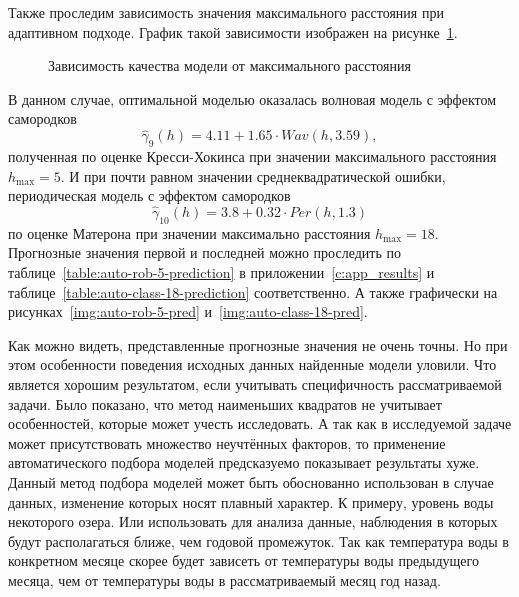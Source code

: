 Также проследим зависимость значения максимального расстояния при адаптивном подходе. График такой зависимости изображен на рисунке~\ref{img:auto-mse-cutoff}.
\begin{figure}[ht]
\caption{Зависимость качества модели от максимального расстояния}
\label{img:auto-mse-cutoff}
\end{figure}
В данном случае, оптимальной моделью оказалась волновая модель с эффектом самородков
\begin{equation*}
 	\widehat{\gamma}_9(h) = 4.11 + 1.65 \cdot Wav(h, 3.59),
\end{equation*}
полученная по оценке Кресси-Хокинса при значении максимального расстояния $ h_{\text{max}} = 5 $. И при почти равном значении среднеквадратической ошибки, периодическая модель с эффектом самородков
\begin{equation*}
 	\widehat{\gamma}_{10}(h) = 3.8 + 0.32 \cdot Per(h, 1.3)
\end{equation*}
по оценке Матерона при значении максимально расстояния $ h_{\text{max}} = 18 $. Прогнозные значения первой и последней можно проследить по таблице~\ref{table:auto-rob-5-prediction} в приложении~\ref{c:app_results} и таблице~\ref{table:auto-class-18-prediction} соответственно. А также графически на рисунках~\ref{img:auto-rob-5-pred} и~\ref{img:auto-class-18-pred}.


Как можно видеть, представленные прогнозные значения не очень точны. Но при этом особенности поведения исходных данных найденные модели уловили. Что является хорошим результатом, если учитывать специфичность рассматриваемой задачи. Было показано, что метод наименьших квадратов не учитывает особенностей, которые может учесть исследовать. А так как в исследуемой задаче может присутствовать множество неучтённых факторов, то применение автоматического подбора моделей предсказуемо показывает результаты хуже. Данный метод подбора моделей может быть обоснованно использован в случае данных, изменение которых носят плавный характер. К примеру, уровень воды некоторого озера. Или использовать для анализа данные, наблюдения в которых будут располагаться ближе, чем годовой промежуток. Так как температура воды в конкретном месяце скорее будет зависеть от температуры воды предыдущего месяца, чем от температуры воды в рассматриваемый месяц год назад.

